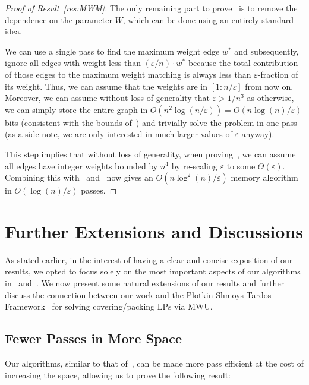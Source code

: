 \documentclass{theoretics}
\newcommand{\eps}{\varepsilon}
\begin{document}
\begin{proof}[Proof of Result~\ref{res:MWM}]
The only remaining part to prove~ is to remove the dependence on the parameter $W$, which can be done using an entirely standard idea.  

We can use a single pass to find the maximum weight edge $w^*$ and subsequently, ignore all edges with weight less than $(\eps/n) \cdot w^*$ because the total contribution of those edges to the maximum weight matching
is always less than $\eps$-fraction of its weight.  Thus, we can assume that the weights are in $[1: n/\eps]$ from now on.  
Moreover, we can assume without loss of generality that $\eps > 1/n^3$ as otherwise, we can simply store the entire graph in $O(n^2\log{(n/\eps)}) = O(n\log{\!(n)}/\eps)$ bits (consistent with the bounds of~) and 
trivially solve the problem in one pass (as a side note, we are only interested in much larger values of $\eps$ anyway). 

This step implies that without loss of generality, when proving~, we can assume all edges have integer weights bounded by  $n^{4}$ by re-scaling $\eps$ to some $\Theta(\eps)$. 
Combining this with~ and~ 
now gives an $O(n\log^2\!{(n)}/\eps)$ memory algorithm in $O(\log{\!(n)}/\eps)$ passes. 
\end{proof}


\section{Further Extensions and Discussions}\label{sec:extensions}

As stated earlier, in the interest of having a clear and concise exposition of our results, we opted to focus solely on the most important aspects of our algorithms in~ and~. We now
 present some natural extensions of our results and further discuss the connection between our work and the Plotkin-Shmoys-Tardos Framework~\cite{PlotkinST91} for solving covering/packing LPs via MWU. 


\subsection{Fewer Passes in More Space}\label{sec:ext-few-pass}

Our algorithms, similar to that of~\cite{AhnG15}, can be made more pass efficient at the cost of increasing the space, allowing us to prove the following result: 
\end{document}
